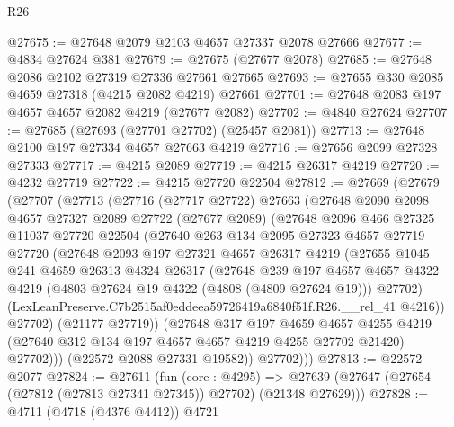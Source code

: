 \begin{lexlean}{R26}
\begin{coremodule}
@27675 := @27648 @2079 @2103 @4657 @27337 @2078 @27666
@27677 := @4834 @27624 @381
@27679 := @27675 (@27677 @2078)
@27685 := @27648 @2086 @2102 @27319 @27336 @27661 @27665
@27693 := @27655 @330 @2085 @4659 @27318 (@4215 @2082 @4219) @27661
@27701 := @27648 @2083 @197 @4657 @4657 @2082 @4219 (@27677 @2082)
@27702 := @4840 @27624
@27707 := @27685 (@27693 (@27701 @27702) (@25457 @2081))
@27713 := @27648 @2100 @197 @27334 @4657 @27663 @4219
@27716 := @27656 @2099 @27328 @27333
@27717 := @4215 @2089
@27719 := @4215 @26317 @4219
@27720 := @4232 @27719
@27722 := @4215 @27720 @22504
@27812 := @27669
    (@27679
      (@27707
        (@27713
          (@27716
            (@27717 @27722)
            @27663
            (@27648
              @2090
              @2098
              @4657
              @27327
              @2089
              @27722
              (@27677 @2089)
              (@27648
                @2096
                @466
                @27325
                @11037
                @27720
                @22504
                (@27640
                  @263
                  @134
                  @2095
                  @27323
                  @4657
                  @27719
                  @27720
                  (@27648
                    @2093
                    @197
                    @27321
                    @4657
                    @26317
                    @4219
                    (@27655
                      @1045
                      @241
                      @4659
                      @26313
                      @4324
                      @26317
                      (@27648
                        @239
                        @197
                        @4657
                        @4657
                        @4322
                        @4219
                        (@4803 @27624 @19 @4322 (@4808 (@4809 @27624 @19)))
                        @27702)
                      (LexLeanPreserve.C7b2515af0eddeea59726419a6840f51f.R26.__rel_41 @4216))
                    @27702)
                  (@21177 @27719))
                (@27648
                  @317
                  @197
                  @4659
                  @4657
                  @4255
                  @4219
                  (@27640 @312 @134 @197 @4657 @4657 @4219 @4255 @27702 @21420)
                  @27702)))
            (@22572 @2088 @27331 @19582))
          @27702)))
@27813 := @22572 @2077
@27824 := @27611
    (fun (core : @4295) =>
    @27639 (@27647 (@27654 (@27812 (@27813 @27341 @27345)) @27702) (@21348 @27629)))
@27828 := @4711 (@4718 (@4376 @4412)) @4721

\end{coremodule}
\end{lexlean}
